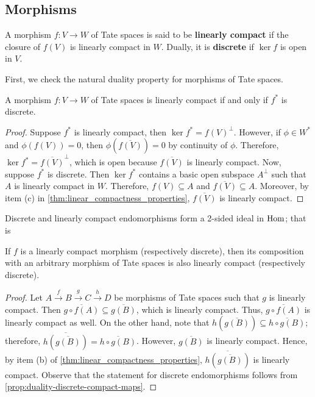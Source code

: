 \subsection{Morphisms}
\begin{definition}\label{def:linearly-compact-and-discrete-morphisms}
	A morphism $f\colon V\to W$ of Tate spaces is said to be \textbf{linearly compact} if the closure of $f(V)$ is linearly compact in $W$. Dually, it is \textbf{discrete} if $\ker f$ is open in $V$. 
\end{definition}
First, we check the natural duality property for morphisms of Tate spaces.
\begin{proposition}\label{prop:duality-discrete-compact-maps}
	A morphism $f\colon V\to W$ of Tate spaces is linearly compact if and only if $f^{*}$ is discrete.
\end{proposition}
\begin{proof}
	Suppose $f^{*}$ is linearly compact, then $\ker f^{*} = f(V)^{\perp}$. However, if $\phi\in W^{*}$ and $\phi(f(V)) = 0$, then $\phi(\overline{f(V)}) = 0$ by continuity of $\phi$. Therefore, $\ker f^{*} = \overline{f(V)}^{\perp}$, which is open because $\overline{f(V)}$ is linearly compact. Now, suppose $f^{*}$ is discrete. Then $\ker f^{*}$ contains a basic open subspace $A^{\perp}$ such that $A$ is linearly compact in $W$. Therefore, $f(V)\subseteq A$ and $\overline{f(V)} \subseteq A$. Moreover, by item (c) in \cref{thm:linear_compactness_properties}, $\overline{f(V)}$ is linearly compact.
\end{proof}
Discrete and linearly compact endomorphisms form a 2-sided ideal in $\operatorname{Hom}$; that is
\begin{proposition}\label{prop:compact-and-discrete-2-sided-ideal}
	If $f$ is a linearly compact morphism (respectively discrete), then its composition with an arbitrary morphism of Tate spaces is also linearly compact (respectively discrete). 
\end{proposition}
\begin{proof}
	Let $A \xrightarrow{f} B \xrightarrow{g} C \xrightarrow{h} D$ be morphisms of Tate spaces such that $g$ is linearly compact. Then $\overline{g\circ f(A)} \subseteq \overline{g(B)}$, which is linearly compact. Thus, $\overline{g\circ f(A)}$ is linearly compact as well. On the other hand, note that $h(\overline{g(B)}) \subseteq \overline{h\circ g(B)}$; therefore, $\overline{h(\overline{g(B)})} = \overline{h\circ g(B)}$. However, $\overline{g(B)}$ is linearly compact. Hence, by item (b) of \cref{thm:linear_compactness_properties}, $\overline{h(\overline{g(B)})}$ is linearly compact. Observe that the statement for discrete endomorphisms follows from \cref{prop:duality-discrete-compact-maps}.
\end{proof}
